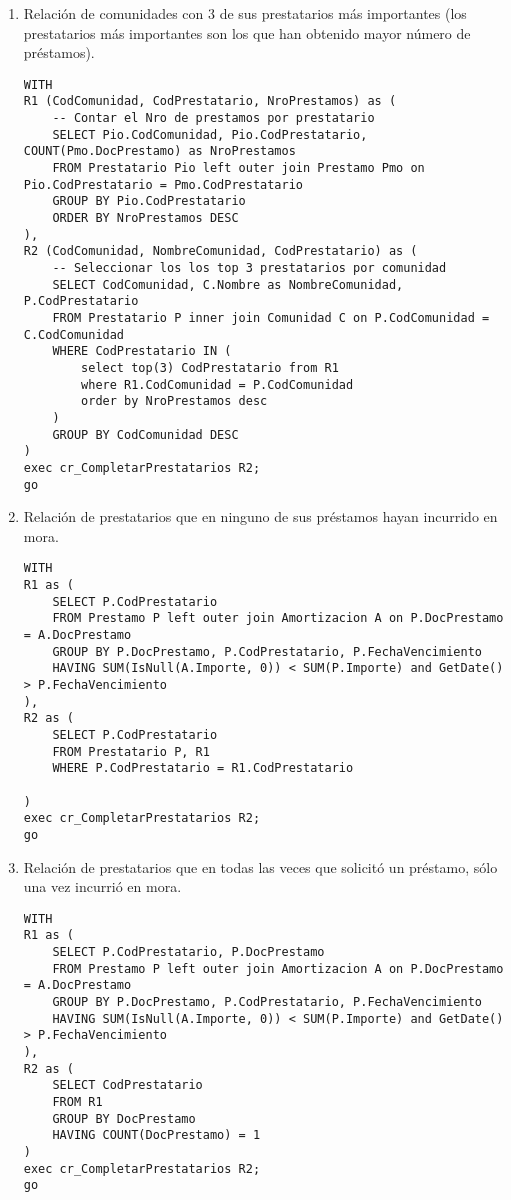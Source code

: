 \begin{enumerate}
\item Relación de comunidades con 3 de sus prestatarios más importantes (los
prestatarios más importantes son los que han obtenido mayor número de
préstamos).
\begin{verbatim}
WITH
R1 (CodComunidad, CodPrestatario, NroPrestamos) as (
    -- Contar el Nro de prestamos por prestatario
    SELECT Pio.CodComunidad, Pio.CodPrestatario, COUNT(Pmo.DocPrestamo) as NroPrestamos
    FROM Prestatario Pio left outer join Prestamo Pmo on Pio.CodPrestatario = Pmo.CodPrestatario
    GROUP BY Pio.CodPrestatario
    ORDER BY NroPrestamos DESC
),
R2 (CodComunidad, NombreComunidad, CodPrestatario) as (
    -- Seleccionar los los top 3 prestatarios por comunidad
    SELECT CodComunidad, C.Nombre as NombreComunidad, P.CodPrestatario
    FROM Prestatario P inner join Comunidad C on P.CodComunidad = C.CodComunidad
    WHERE CodPrestatario IN (
        select top(3) CodPrestatario from R1
        where R1.CodComunidad = P.CodComunidad
        order by NroPrestamos desc
    )
    GROUP BY CodComunidad DESC
)
exec cr_CompletarPrestatarios R2;
go
\end{verbatim}

\item Relación de prestatarios que en ninguno de sus préstamos hayan incurrido en mora.
\begin{verbatim}
WITH
R1 as (
    SELECT P.CodPrestatario
    FROM Prestamo P left outer join Amortizacion A on P.DocPrestamo = A.DocPrestamo
    GROUP BY P.DocPrestamo, P.CodPrestatario, P.FechaVencimiento
    HAVING SUM(IsNull(A.Importe, 0)) < SUM(P.Importe) and GetDate() > P.FechaVencimiento
),
R2 as (
    SELECT P.CodPrestatario
    FROM Prestatario P, R1
    WHERE P.CodPrestatario = R1.CodPrestatario

)
exec cr_CompletarPrestatarios R2;
go
\end{verbatim}

\item Relación de prestatarios que en todas las veces que solicitó un préstamo,
sólo una vez incurrió en mora.
\begin{verbatim}
WITH
R1 as (
    SELECT P.CodPrestatario, P.DocPrestamo
    FROM Prestamo P left outer join Amortizacion A on P.DocPrestamo = A.DocPrestamo
    GROUP BY P.DocPrestamo, P.CodPrestatario, P.FechaVencimiento
    HAVING SUM(IsNull(A.Importe, 0)) < SUM(P.Importe) and GetDate() > P.FechaVencimiento
),
R2 as (
    SELECT CodPrestatario
    FROM R1
    GROUP BY DocPrestamo
    HAVING COUNT(DocPrestamo) = 1
)
exec cr_CompletarPrestatarios R2;
go
\end{verbatim}


\end{enumerate}
